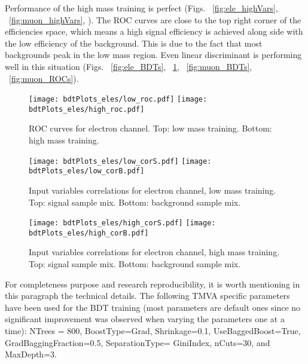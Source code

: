 Performance of the high mass training is perfect (Figs. ~\ref{fig:ele_highVars}, ~\ref{fig:muon_highVars}, ). The ROC curves are close to the top right corner of the efficiencies space, which means a high signal efficiency is achieved along side with the low efficiency of the background. This is due to the
fact that most backgrounds peak in the low mass region. Even linear
discriminant is performing well in this situation (Figs. ~\ref{fig:ele_BDTs}, ~\ref{fig:ele_ROCs}, ~\ref{fig:muon_BDTs}, ~\ref{fig:muon_ROCs}).

\begin{figure}[tbp]
  \begin{center}
   \texttt{[image: bdtPlots\_eles/low\_roc.pdf]}
   \texttt{[image: bdtPlots\_eles/high\_roc.pdf]}
    \caption{ ROC curves for electron channel. Top: low mass training. Bottom: high mass training. }
    \label{fig:ele_ROCs}
  \end{center}
\end{figure}

\begin{figure}[tbp]
  \begin{center}
   \texttt{[image: bdtPlots\_eles/low\_corS.pdf]}
   \texttt{[image: bdtPlots\_eles/low\_corB.pdf]}
    \caption{ Input variables correlations for electron channel, low mass training. Top: signal sample mix. Bottom: background sample mix. }
    \label{fig:ele_cors_low}
  \end{center}
\end{figure}


\begin{figure}[tbp]
  \begin{center}
   \texttt{[image: bdtPlots\_eles/high\_corS.pdf]}
   \texttt{[image: bdtPlots\_eles/high\_corB.pdf]}
    \caption{ Input variables correlations for electron channel, high mass training. Top: signal sample mix. Bottom: background sample mix. }
    \label{fig:ele_cors_high}
  \end{center}
\end{figure}


For completeness purpose and research reproducibility, it is worth mentioning in this paragraph the technical details. The following TMVA specific parameters have been used for the BDT training (most parameters are default ones since no significant improvement was observed when varying the parameters one at a time): NTrees = 800, BoostType=Grad, Shrinkage=0.1, UseBaggedBoost=True, GradBaggingFraction=0.5, SeparationType= GiniIndex, nCuts=30, and MaxDepth=3. %


